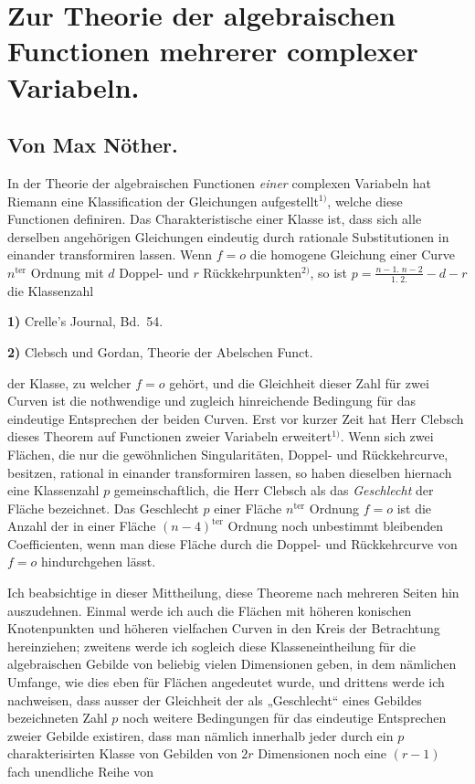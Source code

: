 \documentclass{article}
\begin{document}

\section*{Zur Theorie der algebraischen Functionen mehrerer complexer Variabeln.}

\subsection*{Von Max Nöther.}

In der Theorie der algebraischen Functionen \emph{einer} complexen Variabeln hat Riemann eine Klassification der Gleichungen aufgestellt${}^{1)}$, welche diese Functionen definiren. Das Charakteristische einer Klasse ist, dass sich alle derselben angehörigen Gleichungen eindeutig durch rationale Substitutionen in einander transformiren lassen. Wenn $f = o$ die homogene Gleichung einer Curve $n^{\text{ter}}$ Ordnung mit $d$ Doppel- und $r$ Rückkehrpunkten${}^{2)}$, so ist $p = \frac{n-1.\; n-2}{1.\; 2.} - d - r$ die Klassenzahl

\textbf{1)} Crelle's Journal, Bd.\ 54.

\textbf{2)} Clebsch und Gordan, Theorie der Abelschen Funct.

der Klasse, zu welcher $f = o$ gehört, und die Gleichheit dieser Zahl für zwei Curven ist die nothwendige und zugleich hinreichende Bedingung für das eindeutige Entsprechen der beiden Curven. Erst vor kurzer Zeit hat Herr Clebsch dieses Theorem auf Functionen zweier Variabeln erweitert${}^{1)}$. Wenn sich zwei Flächen, die nur die gewöhnlichen Singularitäten, Doppel- und Rückkehrcurve, besitzen, rational in einander transformiren lassen, so haben dieselben hiernach eine Klassenzahl $p$ gemeinschaftlich, die Herr Clebsch als das \emph{Geschlecht} der Fläche bezeichnet. Das Geschlecht $p$ einer Fläche $n^{\text{ter}}$ Ordnung $f = o$ ist die Anzahl der in einer Fläche $(n-4)^{\text{ter}}$ Ordnung noch unbestimmt bleibenden Coefficienten, wenn man diese Fläche durch die Doppel- und Rückkehrcurve von $f = o$ hindurchgehen lässt.

Ich beabsichtige in dieser Mittheilung, diese Theoreme nach mehreren Seiten hin auszudehnen. Einmal werde ich auch die Flächen mit höheren konischen Knotenpunkten und höheren vielfachen Curven in den Kreis der Betrachtung hereinziehen; zweitens werde ich sogleich diese Klasseneintheilung für die algebraischen Gebilde von beliebig vielen Dimensionen geben, in dem nämlichen Umfange, wie dies eben für Flächen angedeutet wurde, und drittens werde ich nachweisen, dass ausser der Gleichheit der als „Geschlecht“ eines Gebildes bezeichneten Zahl $p$ noch weitere Bedingungen für das eindeutige Entsprechen zweier Gebilde existiren, dass man nämlich innerhalb jeder durch ein $p$ charakterisirten Klasse von Gebilden von $2r$ Dimensionen noch eine $(r-1)$ fach unendliche Reihe von
\end{document}
